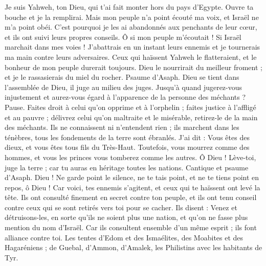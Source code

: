 \begin{multicols}{2}
Je suis Yahweh, ton Dieu, qui t'ai fait monter hors du pays d'Egypte. Ouvre ta bouche et je la remplirai.
Mais mon peuple n'a point écouté ma voix, et Israël ne m'a point obéi.
C'est pourquoi je les ai abandonnés aux penchants de leur cœur, et ils ont suivi leurs propres conseils.
Ô si mon peuple m’écoutait ! Si Israël marchait dans mes voies !
J'abattrais en un instant leurs ennemis et je tournerais ma main contre leurs adversaires.
Ceux qui haïssent Yahweh le flatteraient, et le bonheur de mon peuple durerait toujours.
Dieu le nourrirait du meilleur froment ; et je le rassasierais du miel du rocher.
\VerseOne{}Psaume d'Asaph. Dieu se tient dans l'assemblée de Dieu, il juge au milieu des juges.
Jusqu’à quand jugerez-vous injustement et aurez-vous égard à l'apparence de la personne des méchants ? Pause.
Faites droit à celui qu'on opprime et à l'orphelin ; faites justice à l'affligé et au pauvre ;
délivrez celui qu'on maltraite et le misérable, retirez-le de la main des méchants.
Ils ne connaissent ni n'entendent rien ; ils marchent dans les ténèbres, tous les fondements de la terre sont ébranlés.
J'ai dit : Vous êtes des dieux, et vous êtes tous fils du Très-Haut.
Toutefois, vous mourrez comme des hommes, et vous les princes vous tomberez comme les autres.
Ô Dieu ! Lève-toi, juge la terre ; car tu auras en héritage toutes les nations.
\VerseOne{}Cantique et psaume d'Asaph.
Dieu ! Ne garde point le silence, ne te tais point, et ne te tiens point en repos, ô Dieu !
Car voici, tes ennemis s’agitent, et ceux qui te haïssent ont levé la tête.
Ils ont consulté finement en secret contre ton peuple, et ils ont tenu conseil contre ceux qui se sont retirés vers toi pour se cacher.
Ils disent : Venez et détruisons-les, en sorte qu'ils ne soient plus une nation, et qu'on ne fasse plus mention du nom d'Israël.
Car ils consultent ensemble d'un même esprit ; ils font alliance contre toi.
Les tentes d’Edom et des Ismaélites, des Moabites et des Hagaréniens ;
de Guebal, d’Ammon, d’Amalek, les Philistins avec les habitants de Tyr.

\end{multicols}
